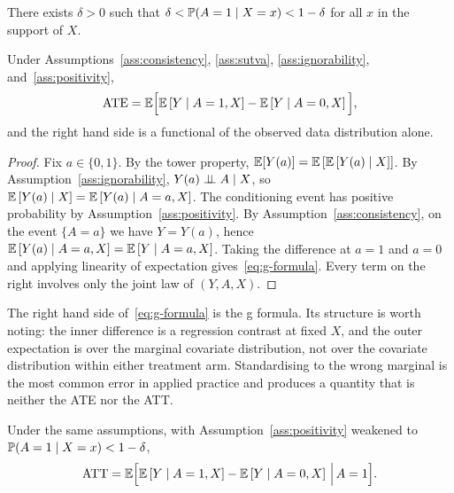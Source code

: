 \begin{assumption}[Positivity]
\label{ass:positivity}
There exists $\delta > 0$ such that
$\delta < \mathbb{P}(A = 1 \mid X = x) < 1 - \delta$ for all $x$ in the support of
$X$.
\end{assumption}

\begin{theorem}
\label{thm:ate-identification}
Under Assumptions~\ref{ass:consistency}, \ref{ass:sutva},
\ref{ass:ignorability}, and~\ref{ass:positivity},
\begin{equation}
  \mathrm{ATE} = \mathbb{E}\Big[ \mathbb{E}\left[ Y \mid A = 1, X \right]
               - \mathbb{E}\left[ Y \mid A = 0, X \right] \Big],
  \label{eq:g-formula}
\end{equation}
and the right hand side is a functional of the observed data distribution alone.
\end{theorem}

\begin{proof}
Fix $a \in \{0,1\}$. By the tower property,
$\mathbb{E}[Y(a)] = \mathbb{E}\left[ \mathbb{E}\left[ Y(a) \mid X \right] \right]$. By
Assumption~\ref{ass:ignorability}, $Y(a) \perp\!\!\!\perp A \mid X$, so
$\mathbb{E}\left[ Y(a) \mid X \right] = \mathbb{E}\left[ Y(a) \mid A = a, X \right]$. The
conditioning event has positive probability by
Assumption~\ref{ass:positivity}. By Assumption~\ref{ass:consistency}, on the
event $\{A = a\}$ we have $Y = Y(a)$, hence
$\mathbb{E}\left[ Y(a) \mid A = a, X \right] = \mathbb{E}\left[ Y \mid A = a, X \right]$.
Taking the difference at $a = 1$ and $a = 0$ and applying linearity of
expectation gives~\eqref{eq:g-formula}. Every term on the right involves only
the joint law of $(Y, A, X)$.
\end{proof}

The right hand side of~\eqref{eq:g-formula} is the g formula.
Its structure is worth noting: the inner difference is a regression contrast at
fixed $X$, and the outer expectation is over the marginal covariate
distribution, not over the covariate distribution within either treatment arm.
Standardising to the wrong marginal is the most common error in applied practice
and produces a quantity that is neither the ATE nor the ATT.

\begin{corollary}
\label{cor:att-identification}
Under the same assumptions, with Assumption~\ref{ass:positivity} weakened to
$\mathbb{P}(A = 1 \mid X = x) < 1 - \delta$,
\begin{equation*}
  \mathrm{ATT} = \mathbb{E}\Big[ \mathbb{E}\left[ Y \mid A = 1, X \right]
               - \mathbb{E}\left[ Y \mid A = 0, X \right] \,\Big|\, A = 1 \Big].
\end{equation*}
\end{corollary}

